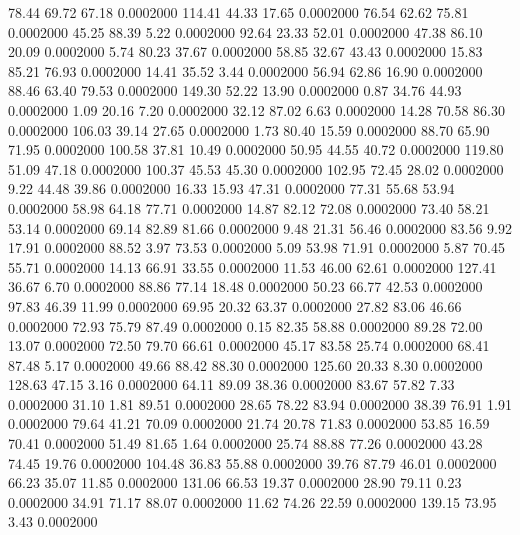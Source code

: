   78.44   69.72   67.18   0.0002000
 114.41   44.33   17.65   0.0002000
  76.54   62.62   75.81   0.0002000
  45.25   88.39    5.22   0.0002000
  92.64   23.33   52.01   0.0002000
  47.38   86.10   20.09   0.0002000
   5.74   80.23   37.67   0.0002000
  58.85   32.67   43.43   0.0002000
  15.83   85.21   76.93   0.0002000
  14.41   35.52    3.44   0.0002000
  56.94   62.86   16.90   0.0002000
  88.46   63.40   79.53   0.0002000
 149.30   52.22   13.90   0.0002000
   0.87   34.76   44.93   0.0002000
   1.09   20.16    7.20   0.0002000
  32.12   87.02    6.63   0.0002000
  14.28   70.58   86.30   0.0002000
 106.03   39.14   27.65   0.0002000
   1.73   80.40   15.59   0.0002000
  88.70   65.90   71.95   0.0002000
 100.58   37.81   10.49   0.0002000
  50.95   44.55   40.72   0.0002000
 119.80   51.09   47.18   0.0002000
 100.37   45.53   45.30   0.0002000
 102.95   72.45   28.02   0.0002000
   9.22   44.48   39.86   0.0002000
  16.33   15.93   47.31   0.0002000
  77.31   55.68   53.94   0.0002000
  58.98   64.18   77.71   0.0002000
  14.87   82.12   72.08   0.0002000
  73.40   58.21   53.14   0.0002000
  69.14   82.89   81.66   0.0002000
   9.48   21.31   56.46   0.0002000
  83.56    9.92   17.91   0.0002000
  88.52    3.97   73.53   0.0002000
   5.09   53.98   71.91   0.0002000
   5.87   70.45   55.71   0.0002000
  14.13   66.91   33.55   0.0002000
  11.53   46.00   62.61   0.0002000
 127.41   36.67    6.70   0.0002000
  88.86   77.14   18.48   0.0002000
  50.23   66.77   42.53   0.0002000
  97.83   46.39   11.99   0.0002000
  69.95   20.32   63.37   0.0002000
  27.82   83.06   46.66   0.0002000
  72.93   75.79   87.49   0.0002000
   0.15   82.35   58.88   0.0002000
  89.28   72.00   13.07   0.0002000
  72.50   79.70   66.61   0.0002000
  45.17   83.58   25.74   0.0002000
  68.41   87.48    5.17   0.0002000
  49.66   88.42   88.30   0.0002000
 125.60   20.33    8.30   0.0002000
 128.63   47.15    3.16   0.0002000
  64.11   89.09   38.36   0.0002000
  83.67   57.82    7.33   0.0002000
  31.10    1.81   89.51   0.0002000
  28.65   78.22   83.94   0.0002000
  38.39   76.91    1.91   0.0002000
  79.64   41.21   70.09   0.0002000
  21.74   20.78   71.83   0.0002000
  53.85   16.59   70.41   0.0002000
  51.49   81.65    1.64   0.0002000
  25.74   88.88   77.26   0.0002000
  43.28   74.45   19.76   0.0002000
 104.48   36.83   55.88   0.0002000
  39.76   87.79   46.01   0.0002000
  66.23   35.07   11.85   0.0002000
 131.06   66.53   19.37   0.0002000
  28.90   79.11    0.23   0.0002000
  34.91   71.17   88.07   0.0002000
  11.62   74.26   22.59   0.0002000
 139.15   73.95    3.43   0.0002000
